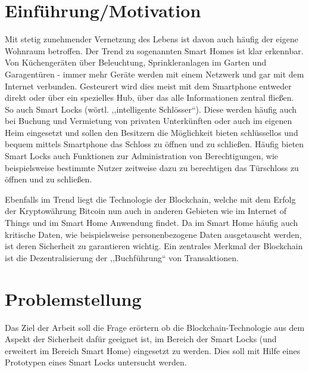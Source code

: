 
\section*{Einführung/Motivation}
    
    Mit stetig zunehmender Vernetzung des Lebens ist davon auch häufig der eigene Wohnraum betroffen. 
    Der Trend zu sogenannten Smart Homes ist klar erkennbar. 
    Von Küchengeräten über Beleuchtung, Sprinkleranlagen im Garten und Ga\-ra\-gen\-tü\-ren - immer mehr Geräte werden mit einem Netzwerk und gar mit dem Internet verbunden. 
    Gesteurert wird dies meist mit dem Smartphone entweder direkt oder über ein spezielles Hub, über das alle Informationen zentral fließen.
    So auch Smart Locks (wörtl. ,,intelligente Schlösser``).
    Diese werden häufig auch bei Buchung und Vermietung von privaten Unterkünften oder auch im eigenen Heim eingesetzt und sollen den Besitzern die Möglichkeit bieten schlüssellos und bequem mittels Smartphone das Schloss zu öffnen und zu schließen.
    Häufig bieten Smart Locks auch Funktionen zur Administration von Berechtigungen, wie beispielsweise bestimmte Nutzer zeitweise dazu zu berechtigen das Türschloss zu öffnen und zu schließen. 
    
    Ebenfalls im Trend liegt die Technologie der Blockchain, welche mit dem Erfolg der Kryptowährung Bitcoin nun auch in anderen Gebieten wie im Internet of Things und im Smart Home Anwendung findet.
    Da im Smart Home häufig auch kritische Daten, wie beispielsweise personenbezogene Daten ausgetauscht werden, ist deren Sicherheit zu garantieren wichtig.
    Ein zentrales Merkmal der Blockchain ist die Dezentralisierung der ,,Buchführung`` von Transaktionen.

\section*{Problemstellung}
    Das Ziel der Arbeit soll die Frage erörtern ob die Block\-chain\--Tech\-no\-lo\-gie aus dem Aspekt der Sicherheit dafür geeignet ist, im Bereich der Smart Locks (und erweitert im Bereich Smart Home) eingesetzt zu werden.
    Dies soll mit Hilfe eines Prototypen eines Smart Locks untersucht werden.
    
